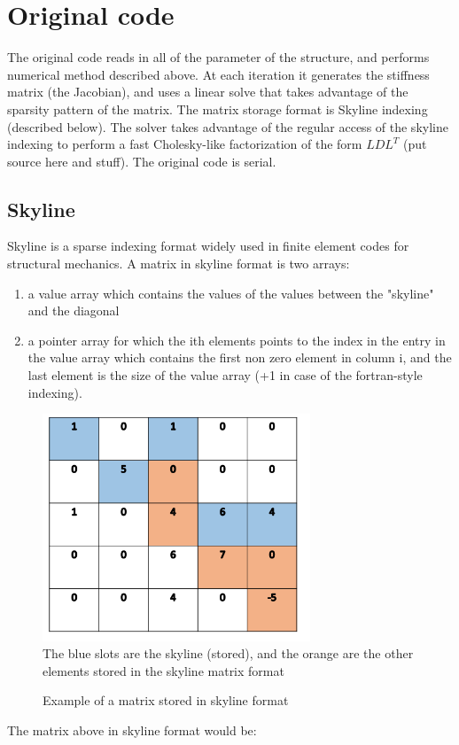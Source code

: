 \documentclass[11pt]{article}
\begin{document}
\section{Original code}
The original code reads in all of the parameter of the structure, and performs numerical method described above. At each iteration it generates the stiffness matrix (the Jacobian), and uses a linear solve that takes advantage of the sparsity pattern of the matrix. The matrix storage format is Skyline indexing (described below). The solver takes advantage of the regular access of the skyline indexing to perform a fast Cholesky-like factorization of the form $LDL^T$ (put source here and stuff). The original code is serial.


\subsection{Skyline}
Skyline is a sparse indexing format widely used in finite element codes for structural mechanics. A matrix in skyline format is two arrays: 
\begin{enumerate}

\item a value array which contains the values of the values between the "skyline" and the diagonal
\item a  pointer array for which the ith elements points to the index in the entry in the value array which contains the first non zero element in column i, and the last element is the size of the value array (+1 in case of the fortran-style indexing).

\end{enumerate}

\begin{figure}[h]
\begin{center}

\caption{Example of a matrix stored in skyline format}
\includegraphics[width=8cm]{skyline}
\label{fig:skyline}
\\
The blue slots are the skyline (stored), and the orange are the other elements stored in the skyline matrix format
\end{center}

\end{figure}
The matrix above in skyline format would be:
\end{document}
